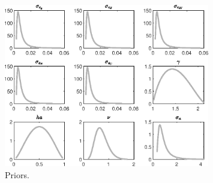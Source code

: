  
\begin{figure}[H]
\centering
\includegraphics[width=0.80\textwidth]{RBC_growth/graphs/RBC_growth_Priors1}
\caption{Priors.}\label{Fig:Priors:1}
\end{figure}
